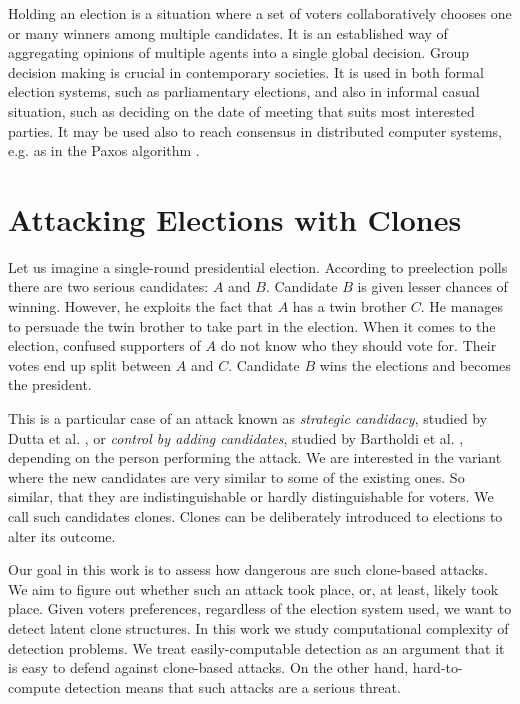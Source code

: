 Holding an election is a situation where a set of voters collaboratively chooses
one or many winners among multiple candidates.
It is an established way of aggregating opinions of multiple agents into a single global decision.
Group decision making is crucial in contemporary societies.
It is used in both formal election systems, such as parliamentary elections,
and also in informal casual situation, such as deciding on the date of meeting that suits most interested parties.
It may be used also to reach consensus in distributed computer systems, e.g. as in the Paxos algorithm \cite{paxos}.

\section{Attacking Elections with Clones}

Let us imagine a single-round presidential election.
According to preelection polls there are two serious candidates: $A$ and $B$.
Candidate $B$ is given lesser chances of winning.
However, he exploits the fact that $A$ has a twin brother $C$.
He manages to persuade the twin brother to take part in the election.
When it comes to the election, confused supporters of $A$ do not know who they should vote for.
Their votes end up split between $A$ and $C$.
Candidate $B$ wins the elections and becomes the president.

This is a particular case of an attack known as \textit{strategic candidacy},
studied by Dutta et al. \cite{strategiccandidacy},
or \textit{control by adding candidates}, studied by Bartholdi et al. \cite{controlbyadding},
depending on the person performing the attack.
We are interested in the variant where the new candidates are very similar to some of the existing ones.
So similar, that they are indistinguishable or hardly distinguishable for voters.
We call such candidates clones.
Clones can be deliberately introduced to elections to alter its outcome.

Our goal in this work is to assess how dangerous are such clone-based attacks.
We aim to figure out whether such an attack took place, or, at least, likely took place.
Given voters preferences, regardless of the election system used, we want to detect latent clone structures.
In this work we study computational complexity of detection problems.
We treat easily-computable detection as an argument that it is easy to defend against clone-based attacks.
On the other hand, hard-to-compute detection means that such attacks are a serious threat.

